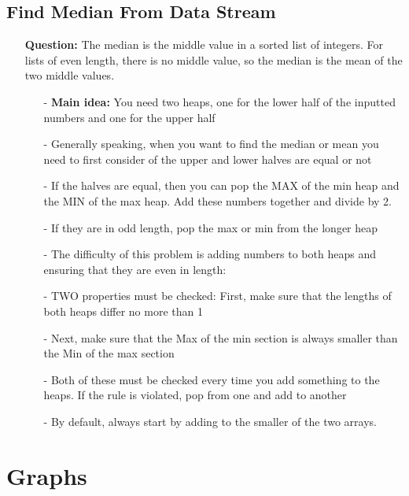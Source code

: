 \documentclass[12pt]{article}
\begin{document}
\subsection{Find Median From Data Stream}
\begin{enumerate}
  \item[] \textbf{Question:} The median is the middle value in a sorted list of integers. For lists of even length, there is no middle value, so the median is the mean of the two middle values.

    \begin{enumerate}
      \item[-] \textbf{Main idea:} You need two heaps, one for the lower half of the inputted numbers and one for the upper half
      \item[-] Generally speaking, when you want to find the median or mean you need to first consider of the upper and lower halves are equal or not
      \item[-] If the halves are equal, then you can pop the MAX of the min heap and the MIN of the max heap. Add these numbers together and divide by 2.
      \item[-] If they are in odd length, pop the max or min from the longer heap
      \item[-] The difficulty of this problem is adding numbers to both heaps and ensuring that they are even in length:
      \item[-] TWO properties must be checked: First, make sure that the lengths of both heaps differ no more than 1
      \item[-] Next, make sure that the Max of the min section is always smaller than the Min of the max section
      \item[-] Both of these must be checked every time you add something to the heaps. If the rule is violated, pop from one and add to another 
      \item[-] By default, always start by adding to the smaller of the two arrays.
    \end{enumerate}
\end{enumerate}


\section{Graphs}
\end{document}
